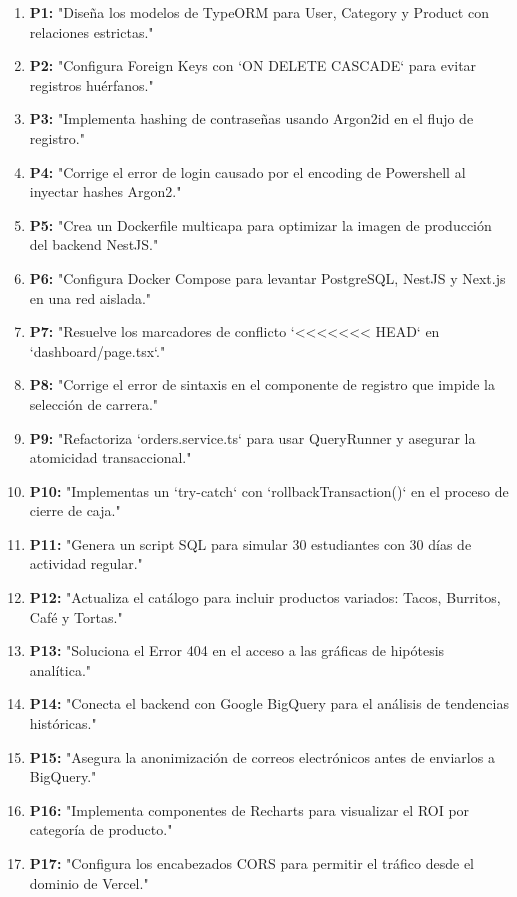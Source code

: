 \documentclass[11pt,a4paper]{article}
\begin{document}
\begin{enumerate}[itemsep=0pt, parsep=0pt]
    \item \textbf{P1:} "Diseña los modelos de TypeORM para User, Category y Product con relaciones estrictas."
    \item \textbf{P2:} "Configura Foreign Keys con `ON DELETE CASCADE` para evitar registros huérfanos."
    \item \textbf{P3:} "Implementa hashing de contraseñas usando Argon2id en el flujo de registro."
    \item \textbf{P4:} "Corrige el error de login causado por el encoding de Powershell al inyectar hashes Argon2."
    \item \textbf{P5:} "Crea un Dockerfile multicapa para optimizar la imagen de producción del backend NestJS."
    \item \textbf{P6:} "Configura Docker Compose para levantar PostgreSQL, NestJS y Next.js en una red aislada."
    \item \textbf{P7:} "Resuelve los marcadores de conflicto `<<<<<<< HEAD` en `dashboard/page.tsx`."
    \item \textbf{P8:} "Corrige el error de sintaxis en el componente de registro que impide la selección de carrera."
    \item \textbf{P9:} "Refactoriza `orders.service.ts` para usar QueryRunner y asegurar la atomicidad transaccional."
    \item \textbf{P10:} "Implementas un `try-catch` con `rollbackTransaction()` en el proceso de cierre de caja."
    \item \textbf{P11:} "Genera un script SQL para simular 30 estudiantes con 30 días de actividad regular."
    \item \textbf{P12:} "Actualiza el catálogo para incluir productos variados: Tacos, Burritos, Café y Tortas."
    \item \textbf{P13:} "Soluciona el Error 404 en el acceso a las gráficas de hipótesis analítica."
    \item \textbf{P14:} "Conecta el backend con Google BigQuery para el análisis de tendencias históricas."
    \item \textbf{P15:} "Asegura la anonimización de correos electrónicos antes de enviarlos a BigQuery."
    \item \textbf{P16:} "Implementa componentes de Recharts para visualizar el ROI por categoría de producto."
    \item \textbf{P17:} "Configura los encabezados CORS para permitir el tráfico desde el dominio de Vercel."

\end{enumerate}
\end{document}
